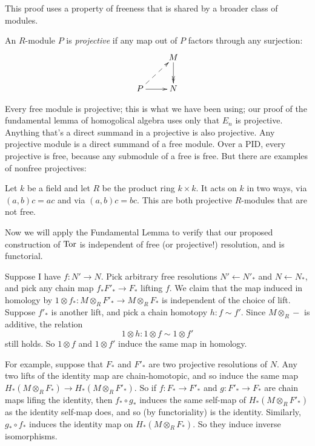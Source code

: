 This proof uses a property of freeness that is shared by a broader class of
modules. 

\begin{definition}
An $R$-module $P$ is {\em projective} if any map out of $P$ factors through 
any surjection:
\begin{equation*}
\xymatrix{ & M\ar@{->>}[d]\\
P\ar@{-->}[ur]\ar[r] & N}
\end{equation*}
\end{definition}
Every free module is projective; this is what we have been using;
our proof of the fundamental lemma of homogolical algebra uses only that 
$E_n$ is projective. 
Anything that's a direct summand in a projective is also projective. Any projective module is a direct summand of a free module. Over a PID, every projective is free, because any submodule of a free is free. But there are examples of
nonfree projectives: 
\begin{example}
Let $k$ be a field and let $R$ be the product ring $k\times k$. It acts on $k$
in two ways, via $(a,b)c=ac$ and via $(a,b)c=bc$. This are both projective $R$-modules that are not free.
\end{example}

Now we will apply the Fundamental Lemma 
to verify that our proposed construction of 
$\operatorname{Tor}$ is independent of free (or projective!) resolution, and is functorial. 

Suppose I have $f:N'\to N$. Pick arbitrary free resolutions 
$N'\leftarrow N'_*$ and $N\leftarrow N_*$, and pick any chain map 
$f_*F'_*\to F_*$ lifting $f$. We claim that the map
induced in homology by $1\otimes f_*:M\otimes_RF'_*\to M\otimes_RF_*$
is independent of the choice of lift. Suppose $f'_*$ is another lift,
and pick a chain homotopy $h:f\sim f'$. Since $M\otimes_R-$ is additive, 
the relation 
\[
1\otimes h:1\otimes f\sim 1\otimes f'
\] 
still holds. So $1\otimes f$ and $1\otimes f'$ induce the same map in homology.

For example, suppose that $F_*$ and $F'_*$ are two projective resolutions of 
$N$. Any two lifts of the identity map are chain-homotopic, and so induce
the same map $H_*(M\otimes_RF_*)\to H_*(M\otimes_RF'_*)$. So if $f:F_*\to F'_*$
and $g:F'_*\to F_*$ are chain maps lifing the identity, then $f_*\circ g_*$
induces the same self-map of $H_*(M\otimes_RF'_*)$ as the identity self-map 
does, and so (by functoriality) is the identity. Similarly, $g_*\circ f_*$
induces the identity map on $H_*(M\otimes_RF_*)$. So they induce inverse
isomorphisms. 

